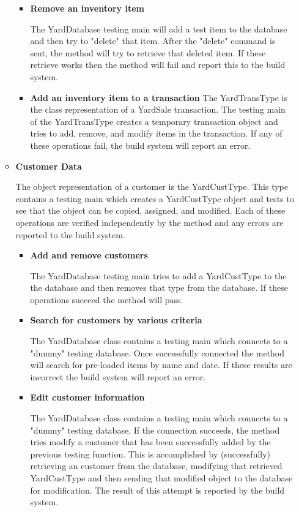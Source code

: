 \documentclass{report}
\begin{document}
\begin{itemize}
\begin{itemize}
\begin{itemize}
                    \item {\textbf{Remove an inventory item}}

		    The YardDatabase testing main will add a test item to the database and then try to "delete" that item.
		    After the "delete" command is sent, the method will try to retrieve that deleted item. If these retrieve works
		    then the method will fail and report this to the build system.

		\item {\textbf{Add an inventory item to a transaction}}
		The YardTransType is the class representation of a YardSale transaction.  The testing main of the
		YardTransType creates a temporary transaction object and tries to add, remove, and modify items
		in the transaction.  If any of these operations fail, the build system will report an error.

                \end{itemize}
                \item{\textbf{Customer Data}}

		The object representation of a customer is the YardCustType.  This type contains a testing main which
		creates a YardCustType object and tests to see that the object can be copied, assigned, and modified.
		Each of these operations are verified independently by the method and any errors are reported to the build
		system.

                \begin{itemize}
                    \item{\textbf{Add and remove customers}}

		    The YardDatabase testing main tries to add a YardCustType to the the database and then removes that
		    type from the database.  If these operations succeed the method will pass.

                    \item{\textbf{Search for customers by various criteria}}

		The YardDatabase class contains a testing main which connects to a "dummy" testing database.
		 Once successfully connected the method will search for pre-loaded items by name and date.
		    If these results are incorrect the build system will report an error.

                    \item{\textbf{Edit customer information}}

		    The YardDatabase class contains a testing main which connects to a "dummy" testing database.
		    If the connection succeeds, the method tries modify a customer that has been successfully
		    added by the previous testing function.  This is accomplished by (successfully) retrieving an customer from the
		    database, modifying that retrieved YardCustType and then sending that modified object to the database
		    for modification.  The result of this attempt is reported by the build system.


\end{itemize}
\end{itemize}
\end{itemize}
\end{document}
